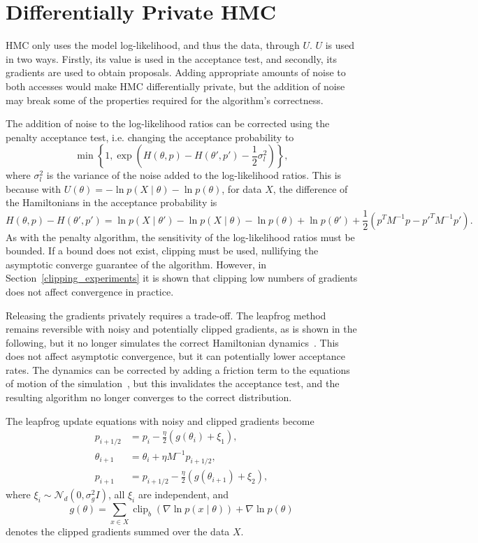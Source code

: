 \documentclass[english,twoside,openright]{HYgraduMLDS}
\newcommand{\caln}{{\mathcal{N}}}
\DeclareMathOperator{\clip}{clip}
\begin{document}
\section{Differentially Private HMC}\label{dp_hmc_section}

HMC only uses the model log-likelihood, and thus the data, through \(U\).
\(U\) is used in two ways. Firstly, its value is used in the acceptance test,
and secondly, its gradients are used to obtain proposals. Adding appropriate
amounts of noise to both accesses would make HMC differentially private, but the addition of
noise may break some of the properties required for the algorithm's correctness.

The addition of noise to the log-likelihood ratios can be corrected using the penalty
acceptance test, i.e. changing the acceptance probability to
\[
    \min\left\{1, \exp\left(H(\theta, p) - H(\theta', p') - \frac{1}{2}\sigma_{l}^{2}\right)\right\},
\]
where \(\sigma_{l}^{2}\) is the variance of the noise added to the log-likelihood
ratios. This is because with
\(U(\theta) = -\ln p(X\mid \theta) - \ln p(\theta)\),  for data \(X\),
the difference of the Hamiltonians in the acceptance probability is
\[
  H(\theta, p) - H(\theta', p') = \ln p(X\mid \theta') - \ln p(X\mid \theta)
  - \ln p(\theta) + \ln p(\theta')
  + \frac{1}{2}(p^{T}M^{-1}p - p'^{T}M^{-1}p').
\]
As with the penalty algorithm, the sensitivity of the log-likelihood ratios must
be bounded. If a bound does not exist, clipping must be used, nullifying the asymptotic
converge guarantee of the algorithm. However, in Section~\ref{clipping_experiments}
it is shown that
clipping low numbers of gradients does not affect convergence in practice.

Releasing the gradients privately requires a trade-off. The leapfrog method remains
reversible with noisy and potentially clipped gradients, as is shown in the following,
but it no longer simulates the correct Hamiltonian dynamics~\cite{CFG14}. This does not affect
asymptotic convergence, but it can potentially lower acceptance rates.
The dynamics can be corrected by adding a friction term to the equations of
motion of the simulation~\cite{CFG14}, but this invalidates the acceptance test,
and the resulting algorithm no longer converges to the correct distribution.

The leapfrog update equations with noisy and clipped gradients become
\begin{align*}
  p_{i+1/2} &= p_{i} - \frac{\eta}{2}(g(\theta_{i}) + \xi_{1}), \\
  \theta_{i+1} &= \theta_{i} + \eta M^{-1}p_{i+1/2}, \\
  p_{i+1} &= p_{i+1/2} - \frac{\eta}{2}(g(\theta_{i+1}) + \xi_{2}),
\end{align*}
where
\(\xi_{i} \sim \caln_{d}(0, \sigma_{g}^{2}I)\), all \(\xi_{i}\) are independent, and
\[
  g(\theta) = \sum_{x\in X}\clip_{b}(\nabla \ln p(x\mid \theta)) + \nabla\ln p(\theta)
\]
denotes the clipped gradients summed over the data \(X\).
\end{document}
